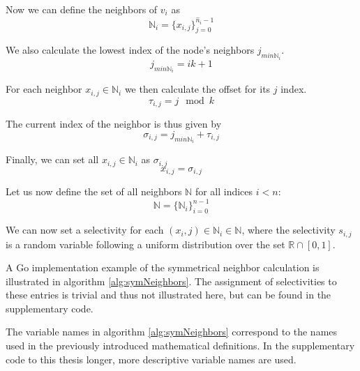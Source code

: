 Now we can define the neighbors of $v_i$ as
\begin{equation}
    \mathbb{N}_i = \{ x_{i, j} \}_{j=0}^{\hat{n}_i - 1} 
\end{equation}

We also calculate the lowest index of the node's neighbors $j_{min\mathbb{N}_i}$.
\begin{equation}
    j_{min\mathbb{N}_i} = ik + 1
\end{equation}

For each neighbor $x_{i, j} \in \mathbb{N}_i$ we then calculate the offset for its $j$ index.
\begin{equation}
    \tau_{i,j} = j\mod{k}
\end{equation}

The current index of the neighbor is thus given by
\begin{equation}
    \sigma_{i,j} = j_{min\mathbb{N}_i} + \tau_{i,j}
\end{equation}

Finally, we can set all $x_{i, j} \in \mathbb{N}_i$ as $\sigma_{i,j}$
\begin{equation}
    x_{i, j} = \sigma_{i,j}
\end{equation}

Let us now define the set of all neighbors $\mathbb{N}$ for all indices $i < n$:
\begin{equation}
    \mathbb{N} = \{\mathbb{N}_i\}_{i=0}^{n-1}
\end{equation}

We can now set a selectivity for each $(x_i,j) \in \mathbb{N}_i \in \mathbb{N}$, where the selectivity $s_{i,j}$ is a random variable following a uniform distribution over the set $\mathbb{R} \cap [0,1]$.

A Go implementation example of the symmetrical neighbor calculation is illustrated in algorithm \ref{alg:symNeighbors}. The assignment of selectivities to these entries is trivial and thus not illustrated here, but can be found in the supplementary code.

\begin{note}
The variable names in algorithm \ref{alg:symNeighbors} correspond to the names used in the previously introduced mathematical definitions. In the supplementary code to this thesis longer, more descriptive variable names are used.
\end{note}

